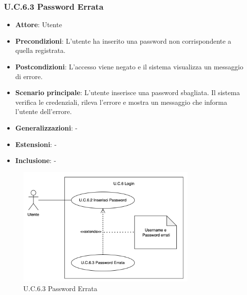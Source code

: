 \subsubsection{U.C.6.3 Password Errata}
\begin{itemize}
    \item \textbf{Attore}: Utente
    \item \textbf{Precondizioni}: L'utente ha inserito una password non corrispondente a quella registrata.
    \item \textbf{Postcondizioni}: L'accesso viene negato e il sistema visualizza un messaggio di errore.
    \item \textbf{Scenario principale}: L'utente inserisce una password sbagliata. Il sistema verifica le credenziali, rileva l'errore e mostra un messaggio che informa l'utente dell'errore.
    \item \textbf{Generalizzazioni}: -
    \item \textbf{Estensioni}: -
    \item \textbf{Inclusione}: -
\end{itemize}
\begin{figure}[H]
    \centering
    \includegraphics[width=0.8\textwidth]{img/UC6.3.png}
    \caption{U.C.6.3 Password Errata}
\end{figure}
\newpage

